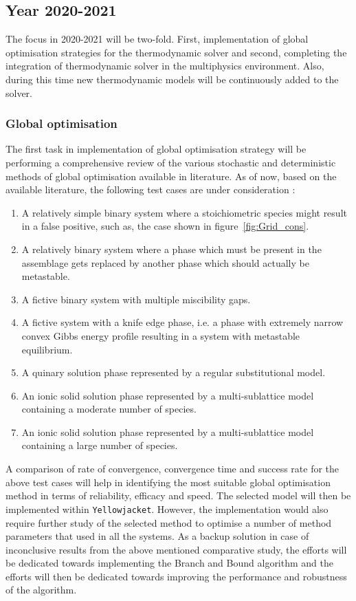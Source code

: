 	\subsection{Year 2020-2021}
	The focus in 2020-2021 will be two-fold. First, implementation of global optimisation strategies for the thermodynamic solver and second, completing the integration of thermodynamic solver in the multiphysics environment. Also, during this time new thermodynamic models will be continuously added to the solver.

	\subsubsection{Global optimisation}
	The first task in implementation of global optimisation strategy will be performing a comprehensive review of the various stochastic and deterministic methods of global optimisation available in literature. As of now, based on the available literature, the following test cases are under consideration \cite{Piro16}:
	\begin{enumerate}
		\item A relatively simple binary system where a stoichiometric species might result in a false positive, such as, the case shown in figure~\ref{fig:Grid_cons}.
		\item A relatively binary system where a phase which must be present in the assemblage gets replaced by another phase which should actually be metastable.
		\item A fictive binary system with multiple miscibility gaps.
		\item A fictive system with a knife edge phase, i.e. a phase with extremely narrow convex Gibbs energy profile resulting in a system with metastable equilibrium.
		\item A quinary solution phase represented by a regular substitutional model.
		\item An ionic solid solution phase represented by a multi-sublattice model containing a moderate number of species.
		\item An ionic solid solution phase represented by a multi-sublattice model containing a large number of species.

	\end{enumerate}
	A comparison of rate of convergence, convergence time and success rate for the above test cases will help in identifying the most suitable global optimisation method in terms of reliability, efficacy and speed. The selected model will then be implemented within \texttt{Yellowjacket}. However, the implementation would also require further study of the selected method to optimise a number of method parameters that  used in all the systems. As a backup solution in case of inconclusive results from the above mentioned comparative study, the efforts will be dedicated towards implementing the Branch and Bound algorithm and the efforts will then be dedicated towards improving the performance and robustness of the algorithm.

